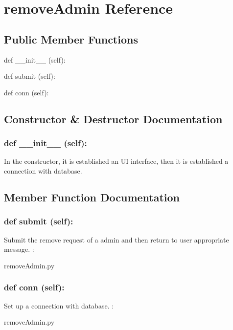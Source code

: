 \hypertarget{removeAdmin}{\section{removeAdmin Reference}
\label{removeAdmin}
}
\subsection*{Public Member Functions}
\begin{DoxyCompactItemize}
\item 
def {\_\_init\_\_} (self):
\item 
def {submit} (self):
\item 
def {conn} (self):
\end{DoxyCompactItemize}

\subsection{Constructor \& Destructor Documentation}
\hypertarget{class_poly_aa3def076b74bed67904976ad4f9fe9b1}{
\subsubsection[{def __init__ (self):}]{\setlength{\rightskip}{0pt plus 5cm}def {\_\_init\_\_} (self): 
}}
In the constructor, it is established an UI interface, then it is  established a connection with database.

\subsection{Member Function Documentation}
\hypertarget{class_poly_a14a7ad77ce612b0c54f531d307ee4b39}{
\subsubsection[{def submit (self):}]{\setlength{\rightskip}{0pt plus 5cm}def {submit} (self):}}\label{class_poly_a14a7ad77ce612b0c54f531d307ee4b39}
Submit the remove request of a admin and then return to user appropriate message.
:\begin{DoxyCompactItemize}
\item 
removeAdmin.\-py\end{DoxyCompactItemize}


\hypertarget{class_poly_a14a7ad77ce612b0c54f531d307ee4b39}{
\subsubsection[{def conn (self):}]{\setlength{\rightskip}{0pt plus 5cm}def {conn} (self):}}\label{class_poly_a14a7ad77ce612b0c54f531d307ee4b39}
Set up a connection with database.
:\begin{DoxyCompactItemize}
\item 
removeAdmin.\-py\end{DoxyCompactItemize}

